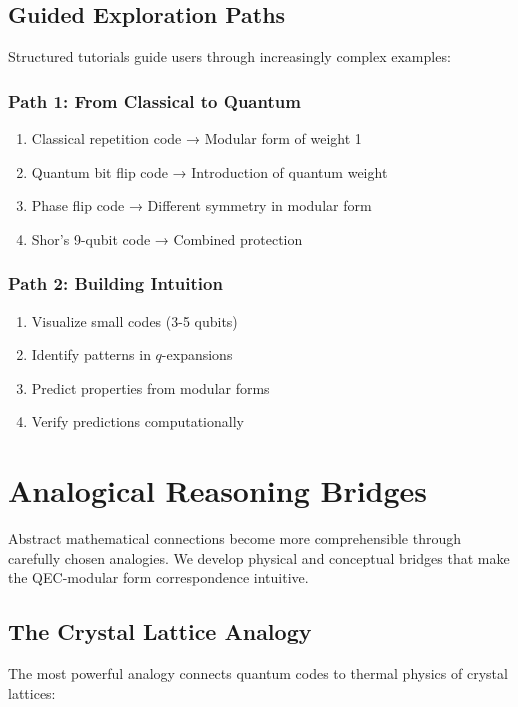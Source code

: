 \documentclass[11pt,a4paper]{article}
\begin{document}
\subsection{Guided Exploration Paths}

Structured tutorials guide users through increasingly complex examples:

\subsubsection{Path 1: From Classical to Quantum}
\begin{enumerate}
\item Classical repetition code → Modular form of weight 1
\item Quantum bit flip code → Introduction of quantum weight
\item Phase flip code → Different symmetry in modular form
\item Shor's 9-qubit code → Combined protection
\end{enumerate}

\subsubsection{Path 2: Building Intuition}
\begin{enumerate}
\item Visualize small codes (3-5 qubits)
\item Identify patterns in $q$-expansions
\item Predict properties from modular forms
\item Verify predictions computationally
\end{enumerate}

\section{Analogical Reasoning Bridges}

Abstract mathematical connections become more comprehensible through carefully chosen analogies. We develop physical and conceptual bridges that make the QEC-modular form correspondence intuitive.

\subsection{The Crystal Lattice Analogy}

The most powerful analogy connects quantum codes to thermal physics of crystal lattices:
\end{document}
